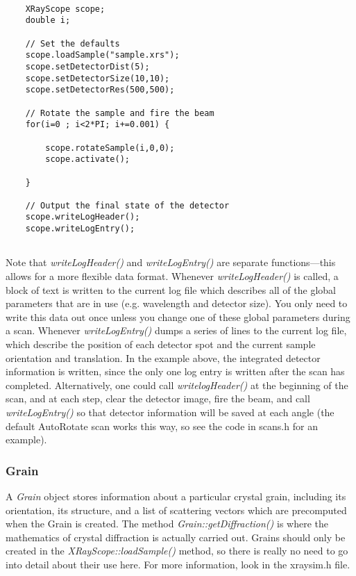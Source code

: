 \documentclass{article}
\begin{document}
\begin{verbatim}
    
    XRayScope scope;
    double i;

    // Set the defaults
    scope.loadSample("sample.xrs");
    scope.setDetectorDist(5);
    scope.setDetectorSize(10,10);
    scope.setDetectorRes(500,500);
    
    // Rotate the sample and fire the beam
    for(i=0 ; i<2*PI; i+=0.001) {
            
        scope.rotateSample(i,0,0);
        scope.activate();

    }

    // Output the final state of the detector
    scope.writeLogHeader();					
    scope.writeLogEntry();


\end{verbatim}

Note that {\em writeLogHeader()} and {\em writeLogEntry()} are
separate functions---this allows for a more flexible data format.
Whenever {\em writeLogHeader()} is called, a block of text is written to the
current log file which describes all of the global parameters that are
in use (e.g. wavelength and detector size).  You only need to write
this data out once unless you change one of these global parameters
during a scan.  Whenever {\em writeLogEntry()} dumps a series of lines to
the current log file, which describe the position of each detector
spot and the current sample orientation and translation. In the
example above, the integrated detector information is written, since
the only one log entry is written after the scan has completed.
Alternatively, one could call {\em writelogHeader()} at the beginning of the
scan, and at each step, clear the detector image, fire the beam, and
call {\em writeLogEntry()} so that detector information will be saved at
each angle (the default AutoRotate scan works this way, so see the
code in scans.h for an example).

\subsubsection{Grain}
A {\em Grain} object stores information about a particular crystal
grain, including its orientation, its structure, and a list of
scattering vectors which are precomputed when the Grain is
created. The method {\em Grain::getDiffraction()} is where the mathematics
of crystal diffraction is actually carried out. Grains should only be
created in the {\em XRayScope::loadSample()} method, so there is really no
need to go into detail about their use here.  For more information,
look in the xraysim.h file.
\end{document}
